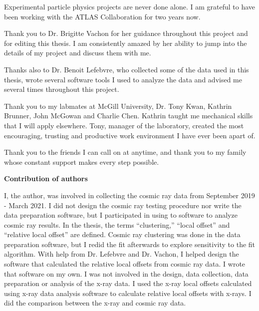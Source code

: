 Experimental particle physics projects are never done alone. I am grateful to have been working with the ATLAS Collaboration for two years now.

Thank you to Dr. Brigitte Vachon for her guidance throughout this project and for editing this thesis. I am consistently amazed by her ability to jump into the details of my project and discuss them with me. 

Thanks also to Dr. Benoit Lefebvre, who collected some of the data used in this thesis, wrote several software tools I used to analyze the data and advised me several times throughout this project. 

Thank you to my labmates at McGill University, Dr. Tony Kwan, Kathrin Brunner, John McGowan and Charlie Chen. Kathrin taught me mechanical skills that I will apply elsewhere. Tony, manager of the laboratory, created the most encouraging, trusting and productive work environment I have ever been apart of.

Thank you to the friends I can call on at anytime, and thank you to my family whose constant support makes every step possible.

\cleardoublepage

 \begin{center}\textbf{Contribution of authors}\end{center}
  
 \noindent

I, the author, was involved in collecting the cosmic ray data from September 2019 - March 2021. I did not design the cosmic ray testing procedure nor write the data preparation software, but I participated in using to software to analyze cosmic ray results. In the thesis, the terms ``clustering,'' ``local offset'' and ``relative local offset'' are defined. Cosmic ray clustering was done in the data preparation software, but I redid the fit afterwards to explore sensitivity to the fit algorithm. With help from Dr. Lefebvre and Dr. Vachon, I helped design the software that calculated the relative local offsets from cosmic ray data. I wrote that software on my own. I was not involved in the design, data collection, data preparation or analysis of the x-ray data. I used the x-ray local offsets calculated using x-ray data analysis software to calculate relative local offsets with x-rays. I did the comparison between the x-ray and cosmic ray data.

